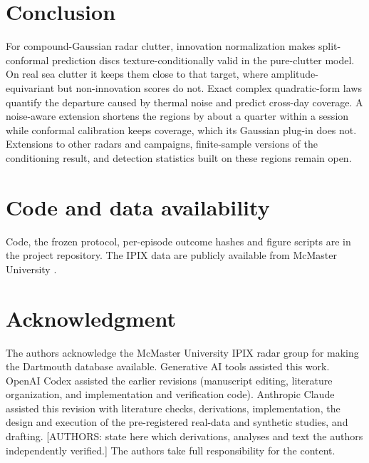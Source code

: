 \documentclass[nolineno]{ieeeaccess}
\begin{document}
\begin{table}[t]
\centering\footnotesize
\caption{Hold-out sessions \#269 and \#287 ($1-\alpha=0.90$; six units per column, about 165 test episodes each). Directional check.}
\label{tab:holdout}
\resizebox{\columnwidth}{!}{}
\end{table}

\section{Conclusion}
For compound-Gaussian radar clutter, innovation normalization makes split-conformal prediction discs texture-conditionally valid in the pure-clutter model. On real sea clutter it keeps them close to that target, where amplitude-equivariant but non-innovation scores do not. Exact complex quadratic-form laws quantify the departure caused by thermal noise and predict cross-day coverage. A noise-aware extension shortens the regions by about a quarter within a session while conformal calibration keeps coverage, which its Gaussian plug-in does not. Extensions to other radars and campaigns, finite-sample versions of the conditioning result, and detection statistics built on these regions remain open.

\section*{Code and data availability}
Code, the frozen protocol, per-episode outcome hashes and figure scripts are in the project repository. The IPIX data are publicly available from McMaster University \cite{ipixweb}.

\section*{Acknowledgment}
The authors acknowledge the McMaster University IPIX radar group for making the Dartmouth database available. Generative AI tools assisted this work. OpenAI Codex assisted the earlier revisions (manuscript editing, literature organization, and implementation and verification code). Anthropic Claude assisted this revision with literature checks, derivations, implementation, the design and execution of the pre-registered real-data and synthetic studies, and drafting. [AUTHORS: state here which derivations, analyses and text the authors independently verified.] The authors take full responsibility for the content.




\EOD
\vfill
\end{document}
